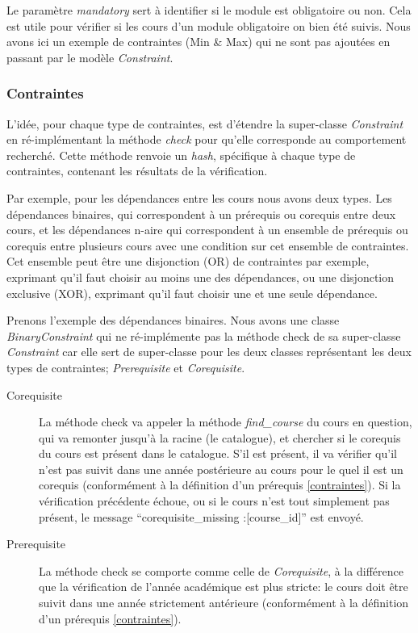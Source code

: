 Le paramètre \textit{mandatory} sert à identifier si le module est obligatoire ou non. Cela est utile pour vérifier si les cours d'un module obligatoire on bien été suivis.
Nous avons ici un exemple de contraintes (Min \& Max) qui ne sont pas ajoutées en passant par le modèle \textit{Constraint}. 


\subsubsection{Contraintes}
L'idée, pour chaque type de contraintes, est d'étendre la super-classe \textit{Constraint} en ré-implémentant la méthode \textit{check} pour qu'elle corresponde au comportement recherché. Cette méthode renvoie un \textit{hash}, spécifique à chaque type de contraintes, contenant les résultats de la vérification.

Par exemple, pour les dépendances entre les cours nous avons deux types. Les dépendances binaires, qui correspondent à un prérequis ou corequis entre deux cours, et les dépendances n-aire qui correspondent à un ensemble de prérequis ou corequis entre plusieurs cours avec une condition sur cet ensemble de contraintes. Cet ensemble peut être une disjonction (OR) de contraintes par exemple, exprimant qu'il faut choisir au moins une des dépendances, ou une disjonction exclusive (XOR), exprimant qu'il faut choisir une et une seule dépendance. 

Prenons l'exemple des dépendances binaires. Nous avons une classe \textit{BinaryConstraint} qui ne ré-implémente pas la méthode check de sa super-classe \textit{Constraint} car elle sert de super-classe pour les deux classes représentant les deux types de contraintes; \textit{Prerequisite} et \textit{Corequisite}. 

\begin{description}
  \item[Corequisite] La méthode check va appeler la méthode \textit{find\_course} du cours en question, qui va remonter jusqu'à la racine (le catalogue), et chercher si le corequis du cours est présent dans le catalogue.  S'il est présent, il va vérifier qu'il n'est pas suivit dans une année postérieure au cours pour le quel il est un corequis (conformément à la définition d'un prérequis \ref{contraintes}). Si la vérification précédente échoue, ou si le cours n'est tout simplement pas présent, le message ``corequisite\_missing :[course\_id]'' est envoyé.
  \item[Prerequisite] La méthode check se comporte comme celle de \textit{Corequisite}, à la différence que la vérification de l'année académique est plus stricte: le cours doit être suivit dans une année strictement antérieure (conformément à la définition d'un prérequis \ref{contraintes}). 
\end{description}

